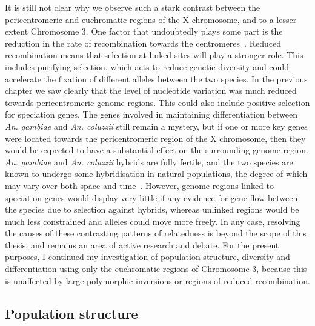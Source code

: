 \documentclass[a4paper,11pt,abstracton,hidelinks]{scrartcl}
\begin{document}
It is still not clear why we observe such a stark contrast between the pericentromeric and euchromatic regions of the X chromosome, and to a lesser extent Chromosome 3.
%
One factor that undoubtedly plays some part is the reduction in the rate of recombination towards the centromeres~\parencite{Cruickshank2014}.
%
Reduced recombination means that selection at linked sites will play a stronger role.
%
This includes purifying selection, which acts to reduce genetic diversity and could accelerate the fixation of different alleles between the two species.
%
In the previous chapter we saw clearly that the level of nucleotide variation was much reduced towards pericentromeric genome regions.
%
This could also include positive selection for speciation genes.
%
The genes involved in maintaining differentiation between \textit{An. gambiae} and \textit{An. coluzzii} still remain a mystery, but if one or more key genes were located towards the pericentromeric region of the X chromosome, then they would be expected to have a substantial effect on the surrounding genome region.
%
\textit{An. gambiae} and \textit{An. coluzzii} hybrids are fully fertile, and the two species are known to undergo some hybridisation in natural populations, the degree of which may vary over both space and time~\parencite{Weetman2012,Lee2013}.
%
However, genome regions linked to speciation genes would display very little if any evidence for gene flow between the species due to selection against hybrids, whereas unlinked regions would be much less constrained and alleles could move more freely.
%
In any case, resolving the causes of these contrasting patterns of relatedness is beyond the scope of this thesis, and remains an area of active research and debate.
%
For the present purposes, I continued my investigation of population structure, diversity and differentiation using only the euchromatic regions of Chromosome 3, because this is unaffected by large polymorphic inversions or regions of reduced recombination.


\subsection{Population structure}\label{subsec:pop-structure}
\end{document}
